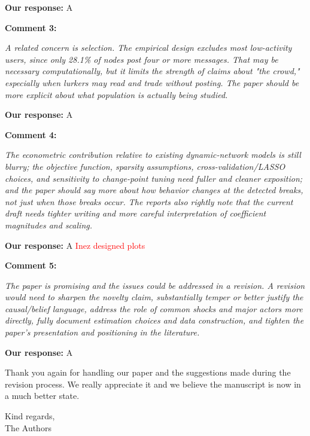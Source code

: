 \documentclass[11pt]{article}
\newcommand{\reviewercomment}[1]{\begin{commentbox}\textit{#1}\end{commentbox}}
\newcommand{\ourresponse}[1]{\textbf{Our response:} #1}
\begin{document}
\ourresponse{A
}

\textbf{Comment 3:}

\reviewercomment{%
	A related concern is selection. The empirical design excludes most low-activity users, since only 28.1\% of nodes post four or more messages. That may be necessary computationally, but it limits the strength of claims about "the crowd," especially when lurkers may read and trade without posting. The paper should be more explicit about what
	population is actually being studied. 
}

\ourresponse{A
}

\textbf{Comment 4:}

\reviewercomment{%
	The econometric contribution relative to existing dynamic-network models is still blurry; the objective function, sparsity assumptions, cross-validation/LASSO choices, and sensitivity to change-point tuning need fuller and cleaner exposition; and the paper should say more about how behavior changes at the detected breaks, not just when those breaks occur. The reports also rightly note that the current draft needs tighter writing and more careful interpretation of coefficient magnitudes and scaling. 
}

\ourresponse{A
\textcolor{red}{Inez designed plots}
}

\textbf{Comment 5:}

\reviewercomment{%
	The paper is promising and the issues could be addressed in a revision. A revision would need to sharpen the novelty claim, substantially temper or better justify the causal/belief language, address the role of common shocks and major actors more directly, fully document estimation choices and data construction, and tighten the paper's presentation and positioning in the literature.
}

\ourresponse{A
}

\bigskip\bigskip

Thank you again for handling our paper and the suggestions made during the revision process. We really appreciate it and we believe the manuscript is now in a much better state. 

\bigskip
Kind regards,\\
The Authors
\end{document}
